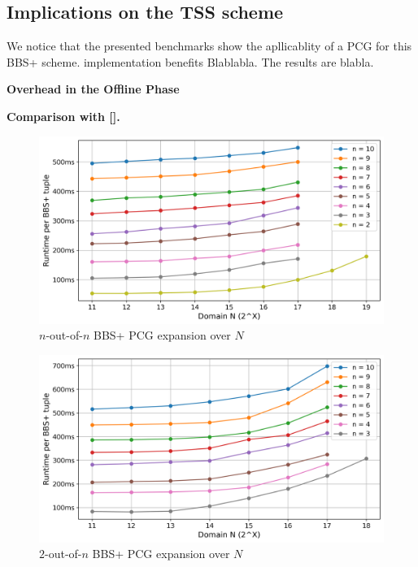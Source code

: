 \subsection{Implications on the TSS scheme}
We notice that the presented benchmarks show the apllicablity of a PCG for this BBS+ scheme.
implementation benefits Blablabla. The results are blabla.  

\textbf{Overhead in the Offline Phase}

\textbf{Comparison with [].}


\begin{figure}[t]
    \centering
    \includegraphics[scale=0.49]{images/plots/bbs_pcg_NoutofN.png}
    \caption{$n$-out-of-$n$ BBS+ PCG expansion over $N$}
    \label{fig:BBSnoutofn}
\end{figure}

\begin{figure}[t]
    \centering
    \includegraphics[scale=0.49]{images/plots/bbs_pcg_TAUoutofN.png}
    \caption{$2$-out-of-$n$ BBS+ PCG expansion over $N$}
    \label{fig:BBStauoutofn}
\end{figure}

